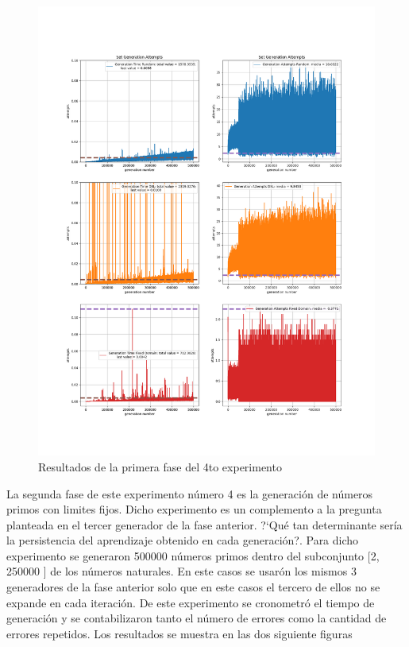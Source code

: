 \begin{figure}[H]
      \includegraphics[width=\linewidth]{Graphics/exp5.png}
      \caption{Resultados de la primera fase del 4to experimento}
      \label{fig:exp_5}
\end{figure}

La segunda fase de este experimento número 4 es la generación de números primos con limites fijos. Dicho experimento
es un complemento a la pregunta planteada en el tercer generador de la fase anterior. ?`Qué tan determinante sería
la persistencia del aprendizaje obtenido en cada generación?. Para dicho experimento se generaron 500000 números primos
dentro del subconjunto [2, 250000 ] de los números naturales. En este casos se usarón los mismos 3 generadores de la
fase anterior solo que en este casos el tercero de ellos no se expande en cada iteración. De este experimento se cronometró
el tiempo de generación y se contabilizaron tanto el número de errores como la cantidad de errores repetidos. Los resultados
se muestra en las dos siguiente figuras

